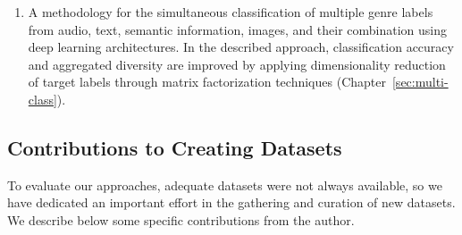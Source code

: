 \begin{enumerate}

\item 
A methodology for the simultaneous classification of multiple genre labels from audio, text, semantic information, images, and their combination using deep learning architectures. In the described approach, classification accuracy and aggregated diversity are improved by applying dimensionality reduction of target labels through matrix factorization techniques (Chapter~\ref{sec:multi-class}). %

\end{enumerate}

\subsection{Contributions to Creating Datasets}

To evaluate our approaches, adequate datasets were not always available, so we have dedicated an important effort in the gathering and curation of new datasets. We describe below some specific contributions from the author. 

